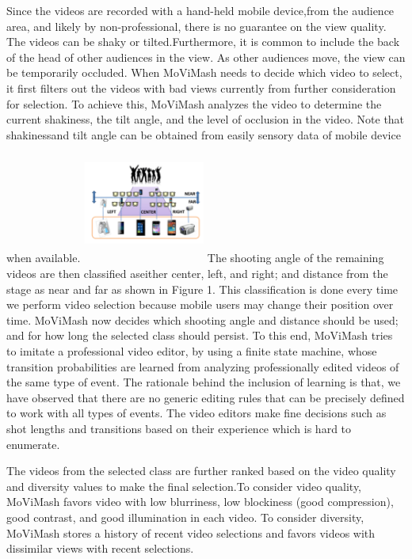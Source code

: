 \documentclass{sig-alternate}
\begin{document}
Since the videos are recorded with a hand-held mobile device,from the audience area, and likely by non-professional, there is no guarantee on the view quality. The videos can be shaky or tilted.Furthermore, it is common to include the back of the head of other audiences in the view. As other audiences move, the view can be temporarily occluded. When MoViMash needs to decide which video to select, it first filters out the videos with bad views currently from further consideration for selection. To achieve this, MoViMash analyzes the video to determine the current shakiness, the tilt angle, and the level of occlusion in the video. Note that shakinessand tilt angle can be obtained from easily sensory data of mobile device when available.
\includegraphics[width=4cm, height=4cm]{img1.png}
The shooting angle of the remaining videos are then classified aseither center, left, and right; and distance from the stage as near and far as shown in Figure 1. This classification is done every time we perform video selection because mobile users may change their position over time. MoViMash now decides which shooting angle and distance should be used; and for how long the selected class should persist. To this end, MoViMash tries to imitate a professional video editor, by using a finite state machine, whose transition probabilities are learned from analyzing professionally edited videos of the same type of event. The rationale behind the inclusion of learning is that, we have observed that there are no generic editing rules that can be precisely defined to work with all types of events. The video editors make fine decisions such as shot lengths and transitions based on their experience which is hard to enumerate.

The videos from the selected class are further ranked based on the video quality and diversity values to make the final selection.To consider video quality, MoViMash favors video with low blurriness, low blockiness (good compression), good contrast, and good illumination in each video. To consider diversity, MoViMash stores a history of recent video selections and favors videos with dissimilar views with recent selections.
\end{document}
